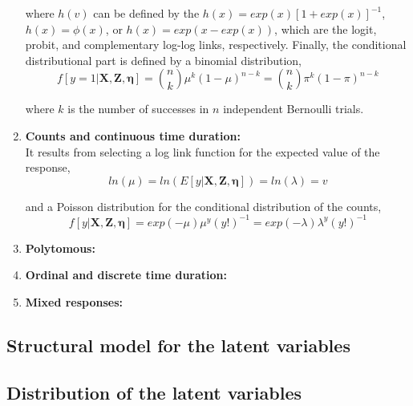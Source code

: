 \begin{enumerate}
	where $h(v)$ can be defined by the $h(x) = exp(x)[1 + exp(x)]^{-1}$, $h(x) = \phi(x)$, or $h(x) = exp(x - exp(x))$, which are the logit, probit, and complementary log-log links, respectively. Finally, the conditional distributional part is defined by a binomial distribution,
	\begin{equation} \label{eq:dist_dich}
		f[y=1 | \mathbf{X}, \mathbf{Z}, \pmb{\eta}] = \binom{n}{k} \mu^{k} (1-\mu)^{n-k}= \binom{n}{k} \pi^{k} (1-\pi)^{n-k}
	\end{equation}

	where $k$ is the number of successes in $n$ independent Bernoulli trials. 
	
	
	\item \textbf{Counts and continuous time duration:} \\
	It results from selecting a log link function for the expected value of the response,
	\begin{equation} \label{eq:link_count}
		ln(\mu) = ln(E[y | \mathbf{X}, \mathbf{Z}, \pmb{\eta}]) = ln(\lambda) = v
	\end{equation}
	
	and a Poisson distribution for the conditional distribution of the counts,
	\begin{equation} \label{eq:dist_count}
		f[y| \mathbf{X}, \mathbf{Z}, \pmb{\eta}] = exp(-\mu) \mu^{y} (y!)^{-1} = exp(-\lambda) \lambda^{y} (y!)^{-1}
	\end{equation}

		
	\item \textbf{Polytomous:} \\
	
	\item \textbf{Ordinal and discrete time duration:} \\
		
	\item \textbf{Mixed responses:} \\

\end{enumerate}

\subsection{Structural model for the latent variables}

\subsection{Distribution of the latent variables}



